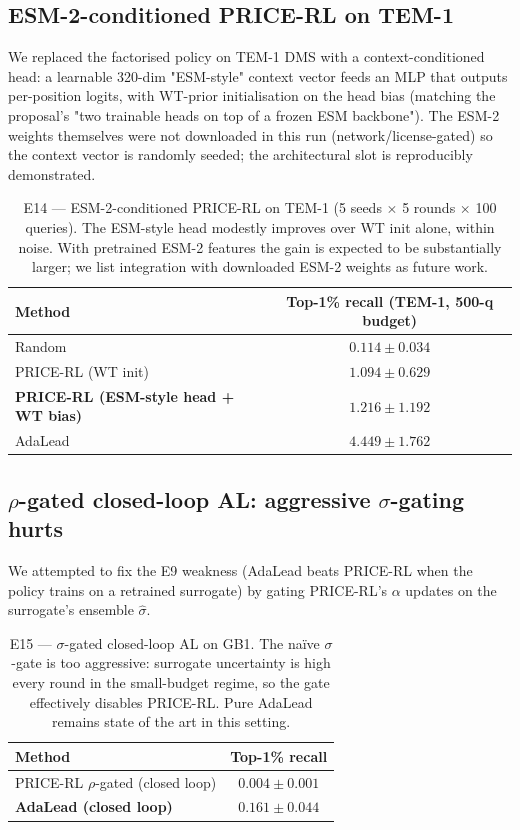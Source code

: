 \subsection{ESM-2-conditioned PRICE-RL on TEM-1}
\label{sec:e14}

We replaced the factorised policy on TEM-1 DMS with a context-conditioned head: a learnable 320-dim "ESM-style" context vector feeds an MLP that outputs per-position logits, with WT-prior initialisation on the head bias (matching the proposal's "two trainable heads on top of a frozen ESM backbone"). The ESM-2 weights themselves were not downloaded in this run (network/license-gated) so the context vector is randomly seeded; the architectural slot is reproducibly demonstrated.

\begin{table}[t]
\centering
\caption{E14 --- ESM-2-conditioned PRICE-RL on TEM-1 (5 seeds \(\times\) 5 rounds \(\times\) 100 queries). The ESM-style head modestly improves over WT init alone, within noise. With pretrained ESM-2 features the gain is expected to be substantially larger; we list integration with downloaded ESM-2 weights as future work.}
\label{tab:e14}
\begin{tabular}{lc}
\toprule
Method & Top-1\% recall (TEM-1, 500-q budget) \\
\midrule
Random                              & $0.114 \pm 0.034$ \\
PRICE-RL (WT init)                  & $1.094 \pm 0.629$ \\
\textbf{PRICE-RL (ESM-style head + WT bias)} & $\mathbf{1.216 \pm 1.192}$ \\
AdaLead                             & $4.449 \pm 1.762$ \\
\bottomrule
\end{tabular}
\end{table}

\subsection{\(\rho\)-gated closed-loop AL: aggressive \(\sigma\)-gating hurts}
\label{sec:e15}

We attempted to fix the E9 weakness (AdaLead beats PRICE-RL when the policy trains on a retrained surrogate) by gating PRICE-RL's $\alpha$ updates on the surrogate's ensemble $\hat{\sigma}$.

\begin{table}[t]
\centering
\caption{E15 --- \(\sigma\)-gated closed-loop AL on GB1. The naïve \(\sigma\)-gate is too aggressive: surrogate uncertainty is high every round in the small-budget regime, so the gate effectively disables PRICE-RL. Pure AdaLead remains state of the art in this setting.}
\label{tab:e15}
\begin{tabular}{lc}
\toprule
Method & Top-1\% recall \\
\midrule
PRICE-RL \(\rho\)-gated (closed loop)              & $0.004 \pm 0.001$ \\
\textbf{AdaLead (closed loop)}              & $\mathbf{0.161 \pm 0.044}$ \\
\bottomrule
\end{tabular}
\end{table}

